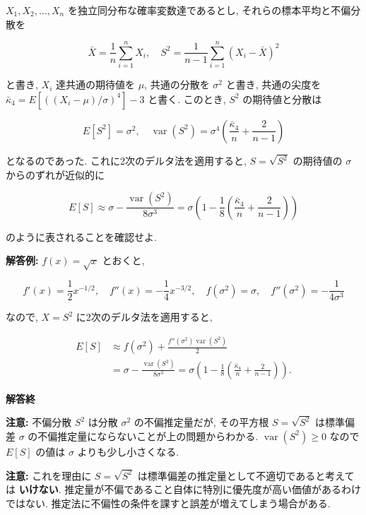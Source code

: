 \documentclass[
  letterpaper,
  DIV=11,
  numbers=noendperiod]{scrartcl}
\begin{document}
\(X_1,X_2,\ldots,X_n\) を独立同分布な確率変数達であるとし,
それらの標本平均と不偏分散を

\[
\bar{X} = \frac{1}{n}\sum_{i=1}^n X_i, \quad
S^2 = \frac{1}{n-1}\sum_{i=1}^n(X_i - \bar{X})^2
\]

と書き, \(X_i\) 達共通の期待値を \(\mu\), 共通の分散を \(\sigma^2\)
と書き, 共通の尖度を \(\bar\kappa_4 = E[((X_i-\mu)/\sigma)^4]-3\)
と書く. このとき, \(S^2\) の期待値と分散は

\[
E[S^2] = \sigma^2, \quad
\operatorname{var}(S^2) = \sigma^4\left(\frac{\bar\kappa_4}{n} + \frac{2}{n-1}\right)
\]

となるのであった. これに2次のデルタ法を適用すると, \(S = \sqrt{S^2}\)
の期待値の \(\sigma\) からのずれが近似的に

\[
E[S] \approx
\sigma - \frac{\operatorname{var}(S^2)}{8\sigma^3} =
\sigma\left(1 - \frac{1}{8}\left(\frac{\bar\kappa_4}{n} + \frac{2}{n-1}\right)\right)
\]

のように表されることを確認せよ.

\textbf{解答例:} \(f(x) = \sqrt{x}\) とおくと,

\[
f'(x) = \frac{1}{2}x^{-1/2}, \quad
f''(x) = -\frac{1}{4}x^{-3/2}, \quad
f(\sigma^2) = \sigma,  \quad
f''(\sigma^2) = -\frac{1}{4\sigma^3}
\]

なので, \(X = S^2\) に2次のデルタ法を適用すると,

\[
\begin{aligned}
E[S] &\approx
f(\sigma^2) + \frac{f''(\sigma^2)\operatorname{var}(S^2)}{2} 
\\ &=
\sigma - \frac{\operatorname{var}(S^2)}{8\sigma^3} =
\sigma\left(1 - \frac{1}{8}\left(\frac{\bar\kappa_4}{n} + \frac{2}{n-1}\right)\right).
\end{aligned}
\]

\textbf{解答終}

\textbf{注意:} 不偏分散 \(S^2\) は分散 \(\sigma^2\) の不偏推定量だが,
その平方根 \(S=\sqrt{S^2}\) は標準偏差 \(\sigma\)
の不偏推定量にならないことが上の問題からわかる.
\(\operatorname{var}(S^2) \ge 0\) なので \(E[S]\) の値は \(\sigma\)
よりも少し小さくなる.

\textbf{注意:} これを理由に \(S=\sqrt{S^2}\)
は標準偏差の推定量として不適切であると考えては \textbf{いけない}.
推定量が不偏であること自体に特別に優先度が高い価値があるわけではない.
推定法に不偏性の条件を課すと誤差が増えてしまう場合がある.
\end{document}
